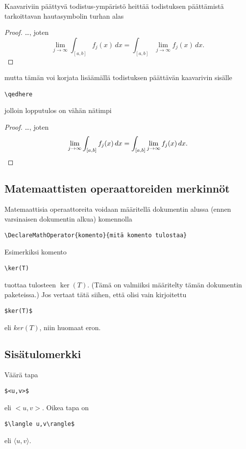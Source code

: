\documentclass[a4paper,12 pt]{article}
\theoremstyle{plain}
\theoremstyle{definition}
\theoremstyle{remark}
\numberwithin{equation}{section}
\numberwithin{figure}{section}
\begin{document}
Kaavariviin päättyvä todistus-ympäristö heittää todistuksen päättämistä tarkoittavan hautasymbolin turhan alas

\begin{proof}
\ldots, joten
\[\lim\limits_{j\to\infty}\int_{\left[a,b\right]}f_j(x)\,dx=\int_{\left[a,b\right]}\lim\limits_{j\to\infty}f_j(x)\,dx.\]
\end{proof}
mutta tämän voi korjata lisäämällä todistuksen päättävän kaavarivin sisälle 

\begin{verbatim}
\qedhere
\end{verbatim}
jolloin lopputulos on vähän nätimpi
\begin{proof}
\ldots, joten
\[\lim\limits_{j\to\infty}\int_{\left[a,b\right]}f_j(x)\,dx=\int_{\left[a,b\right]}\lim\limits_{j\to\infty}f_j(x)\,dx.\qedhere\]
\end{proof}

\subsection*{Matemaattisten operaattoreiden merkinnöt}

Matemaattisia operaattoreita voidaan määritellä dokumentin alussa (ennen varsinaisen dokumentin alkua) komennolla

\begin{verbatim}
\DeclareMathOperator{komento}{mitä komento tulostaa}    
\end{verbatim}
Esimerkiksi komento

\begin{verbatim}
\ker(T)
\end{verbatim}
tuottaa tulosteen $\ker(T)$. (Tämä on valmiiksi määritelty tämän dokumentin paketeissa.) Jos vertaat tätä siihen, että olisi vain kirjoitettu

\begin{verbatim}
$ker(T)$
\end{verbatim}
eli $ker(T)$, niin huomaat eron.

\subsection*{Sisätulomerkki}
Väärä tapa

\begin{verbatim}
$<u,v>$    
\end{verbatim}
eli $<u,v>$. Oikea tapa on

\begin{verbatim}
$\langle u,v\rangle$    
\end{verbatim}
eli $\langle u,v\rangle$.
\end{document}
